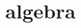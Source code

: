 \documentclass[12pt]{book}
\theoremstyle{definition}
\theoremstyle{remark}
\begin{document}
\title{algebra}


\end{document}
